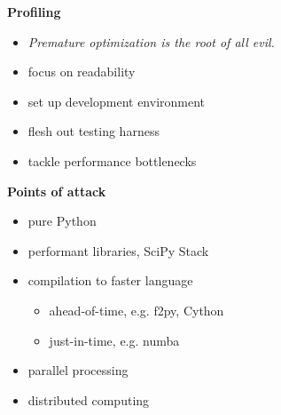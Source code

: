 \begin{frame}\textbf{Profiling}\vspace{0.3cm}

\begin{itemize}\setlength\itemsep{1em}
    \item \textit{Premature optimization is the root of all evil.}
    \item focus on readability
    \item set up development environment
    \item flesh out testing harness
    \item tackle performance bottlenecks
\end{itemize}

\end{frame}
\begin{frame}\textbf{Points of attack}\vspace{0.3cm}

\begin{itemize}\setlength\itemsep{1em}
    \item pure Python
    \item performant libraries, SciPy Stack
    \item compilation to faster language\vspace{0.3cm}
    \begin{itemize}\setlength\itemsep{1em}
        \item ahead-of-time, e.g. f2py, Cython
        \item just-in-time, e.g. numba
    \end{itemize}
    \item parallel processing
    \item distributed computing
\end{itemize}

\end{frame}
\begin{frame}
	\begin{figure}[htp]\centering
	\end{figure}
\end{frame}
